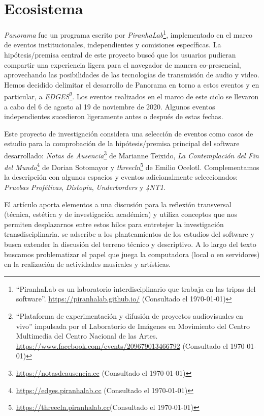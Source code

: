 
\section*{Ecosistema}


\textit{Panorama} \citep{panorama} fue un programa escrito por \textit{PiranhaLab}\footnote{``PiranhaLab es un laboratorio interdisciplinario que trabaja en las tripas del software''. \url{https://piranhalab.github.io/} (Consultado el \today)}, implementado en el marco de eventos institucionales, independientes y comisiones específicas. La hipótesis/premisa central de este proyecto buscó que los usuarios pudieran compartir una experiencia ligera para el navegador de manera co-presencial, aprovechando las posibilidades de las tecnologías de transmisión de audio y video. %
Hemos decidido delimitar el desarrollo de Panorama en torno a estos eventos y en particular, a \textit{EDGES}\footnote{``Plataforma de experimentación y difusión de proyectos audiovisuales en vivo'' impulsada por el Laboratorio de Imágenes en Movimiento del Centro Multimedia del Centro Nacional de las Artes. \url{https://www.facebook.com/events/209679013466792} (Consultado el \today)}. Los eventos realizados en el marco de este ciclo se llevaron a cabo del 6 de agosto al 19 de noviembre de 2020. Algunos eventos independientes sucedieron ligeramente antes o después de estas fechas. 	

Este proyecto de investigación considera una selección de eventos como casos de estudio para la comprobación de la hipótesis/premisa principal del software desarrollado: \textit{Notas de Ausencia}\footnote{\url{https://notasdeausencia.cc} (Consultado el \today)} de Marianne Teixido, \textit{La Contemplación del Fin del Mundo}\footnote{\url{https://edges.piranhalab.cc} (Consultado el \today)} de Dorian Sotomayor y \textit{threecln}\footnote{\url{https://threecln.piranhalab.cc}(Consultado el \today)} de Emilio Ocelotl. Complementamos la descripción con algunos espacios y eventos adicionalmente seleccionados: \textit{Pruebas Proféticas}, \textit{Distopia}, \textit{Underborders} y \textit{4NT1}. %

El artículo aporta elementos a una discusión para la reflexión transversal (técnica, estética y  de investigación académica) y utiliza conceptos que nos permiten desplazarnos entre estos hilos para entretejer la investigación transdisciplinaria. se adscribe a los planteamientos de los estudios del software y busca extender la discusión del terreno técnico y descriptivo. A lo largo del texto buscamos problematizar el papel que juega la computadora (local o en servidores) en la realización de actividades musicales y artísticas.

